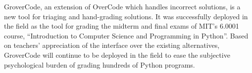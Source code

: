 \documentclass[12pt,twoside]{mitthesis}
\begin{document}
GroverCode, an extension of OverCode which handles incorrect solutions, is a new tool for triaging and hand-grading solutions. It was successfully deployed in the field as the tool for grading the midterm and final exams of MIT's 6.0001 course, ``Introduction to Computer Science and Programming in Python''. Based on teachers' appreciation of the interface over the existing alternatives, GroverCode will continue to be deployed in the field to ease the subjective psychological burden of grading hundreds of Python programs. %
%
%
%
%
%
%


%
%
%
%
\end{document}

